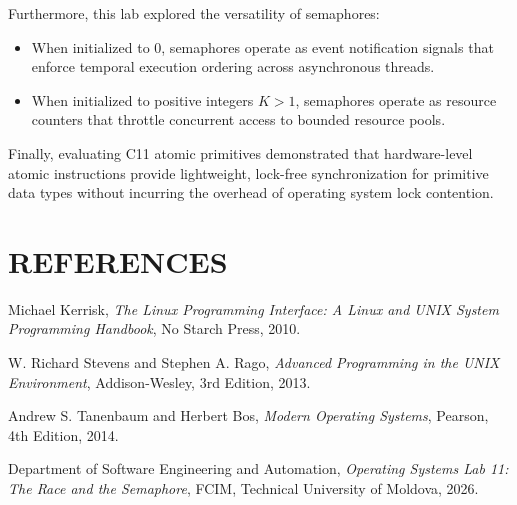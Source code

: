 \documentclass[12pt,a4paper]{report}
\numberwithin{equation}{chapter}
\numberwithin{figure}{chapter}
\numberwithin{table}{chapter}
\begin{document}
Furthermore, this lab explored the versatility of semaphores:
\begin{itemize}
    \item When initialized to 0, semaphores operate as event notification signals that enforce temporal execution ordering across asynchronous threads.
    \item When initialized to positive integers $K > 1$, semaphores operate as resource counters that throttle concurrent access to bounded resource pools.
\end{itemize}

Finally, evaluating C11 atomic primitives demonstrated that hardware-level atomic instructions provide lightweight, lock-free synchronization for primitive data types without incurring the overhead of operating system lock contention.

\chapter*{REFERENCES}

\noindent [1] Michael Kerrisk, \textit{The Linux Programming Interface: A Linux and UNIX System Programming Handbook}, No Starch Press, 2010.

\noindent [2] W. Richard Stevens and Stephen A. Rago, \textit{Advanced Programming in the UNIX Environment}, Addison-Wesley, 3rd Edition, 2013.

\noindent [3] Andrew S. Tanenbaum and Herbert Bos, \textit{Modern Operating Systems}, Pearson, 4th Edition, 2014.

\noindent [4] Department of Software Engineering and Automation, \textit{Operating Systems Lab 11: The Race and the Semaphore}, FCIM, Technical University of Moldova, 2026.
\end{document}
